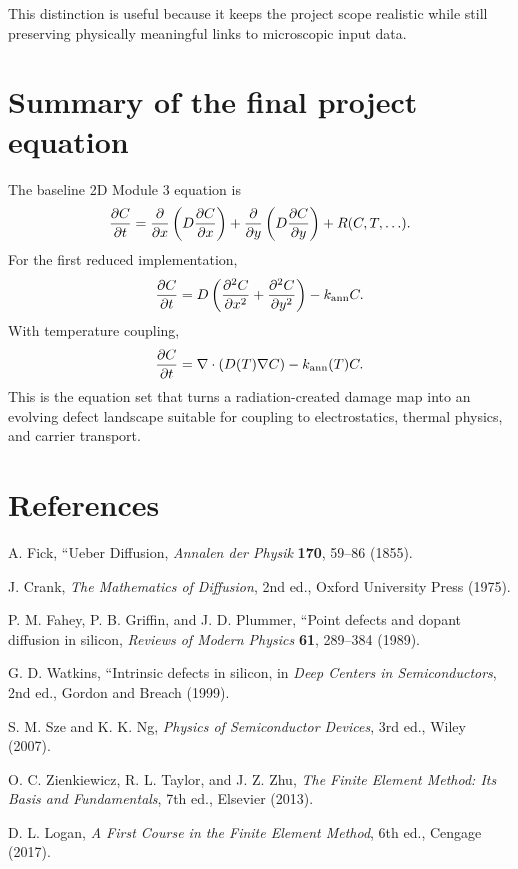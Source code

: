 \documentclass[11pt]{article}
\begin{document}
This distinction is useful because it keeps the project scope realistic while still preserving physically meaningful links to microscopic input data.

\section{Summary of the final project equation}

The baseline 2D Module 3 equation is
\begin{equation}
\pdv{C}{t}
=
\pdv{}{x}\left(D\pdv{C}{x}\right)
+
\pdv{}{y}\left(D\pdv{C}{y}\right)
+ R(C,T,\ldots).
\end{equation}
For the first reduced implementation,
\begin{equation}
\pdv{C}{t}
=
D\left(\pdv[2]{C}{x} + \pdv[2]{C}{y}\right) - k_{\mathrm{ann}}C.
\end{equation}
With temperature coupling,
\begin{equation}
\pdv{C}{t}
=
\nabla\cdot\left(D(T)\nabla C\right) - k_{\mathrm{ann}}(T)C.
\end{equation}
This is the equation set that turns a radiation-created damage map into an evolving defect landscape suitable for coupling to electrostatics, thermal physics, and carrier transport.

\section{References}
\begin{sloppypar}
\begin{enumerate}[label={[\arabic*]}]
\item A. Fick, ``Ueber Diffusion, \emph{Annalen der Physik} \textbf{170}, 59--86 (1855).
\item J. Crank, \emph{The Mathematics of Diffusion}, 2nd ed., Oxford University Press (1975).
\item P. M. Fahey, P. B. Griffin, and J. D. Plummer, ``Point defects and dopant diffusion in silicon, \emph{Reviews of Modern Physics} \textbf{61}, 289--384 (1989).
\item G. D. Watkins, ``Intrinsic defects in silicon, in \emph{Deep Centers in Semiconductors}, 2nd ed., Gordon and Breach (1999).
\item S. M. Sze and K. K. Ng, \emph{Physics of Semiconductor Devices}, 3rd ed., Wiley (2007).
\item O. C. Zienkiewicz, R. L. Taylor, and J. Z. Zhu, \emph{The Finite Element Method: Its Basis and Fundamentals}, 7th ed., Elsevier (2013).
\item D. L. Logan, \emph{A First Course in the Finite Element Method}, 6th ed., Cengage (2017).
\end{enumerate}
\end{sloppypar}
\end{document}
